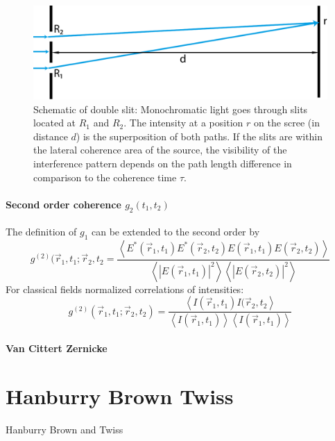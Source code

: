 \begin{figure}
	\centering
	\includegraphics[width=0.8\linewidth]{images/doubleslit.pdf}
	\caption[Schematic of double slit]{Schematic of double slit: Monochromatic light goes through slits located at $R_1$ and $R_2$. The intensity at a position $r$ on the scree (in distance $d$) is the superposition of both paths.  If the slits are within the lateral coherence area of the source, the visibility of the interference pattern depends on the path length difference in comparison to the coherence time $\tau$.}
	\label{fig:doubleslit}
\end{figure}


\paragraph{Second order coherence $g_2(t_1,t_2)$}
The definition of $g_1$ can be extended to the second order by
\begin{equation*}
	g^{(2)}(\vec{r}_1,t_1;\vec{r}_2,t_2= 
	\frac{\left< E^*(\vec{r}_1,t_1)E^*(\vec{r}_2,t_2)E(\vec{r}_1,t_1)E(\vec{r}_2,t_2) \right>}{\left<\left | E(\vec{r}_1,t_1)\right |^2 \right> \left< \left |E(\vec{r}_2,t_2)\right |^2 \right>}	
\end{equation*}
For classical fields normalized correlations of intensities:
\begin{equation}
	g^{(2)}(\vec{r}_1,t_1;\vec{r}_2,t_2)= 
		\frac{\left< I(\vec{r}_1,t_1)I(\vec{r}_2,t_2 \right>}{\left<I(\vec{r}_1,t_1)\right>\left<I(\vec{r}_1,t_1)\right>}	
\end{equation}

\paragraph{Van Cittert Zernicke}

\section{Hanburry Brown Twiss}
Hanburry Brown and Twiss 


